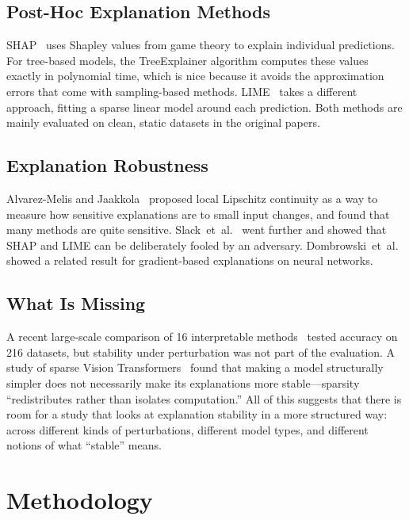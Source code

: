 \documentclass[10pt,twocolumn]{article}
\begin{document}
\subsection{Post-Hoc Explanation Methods}

SHAP~\cite{lundberg2017unified} uses Shapley values from game theory
to explain individual predictions. For tree-based models, the
TreeExplainer algorithm computes these values exactly in polynomial
time, which is nice because it avoids the approximation errors that
come with sampling-based methods.
LIME~\cite{ribeiro2016why} takes a different approach, fitting a
sparse linear model around each prediction. Both methods are mainly
evaluated on clean, static datasets in the original papers.

\subsection{Explanation Robustness}

Alvarez-Melis and Jaakkola~\cite{alvarez2018robustness} proposed
local Lipschitz continuity as a way to measure how sensitive
explanations are to small input changes, and found that many methods
are quite sensitive. Slack~et~al.~\cite{slack2020fooling} went further
and showed that SHAP and LIME can be deliberately fooled by an
adversary. Dombrowski~et~al.~\cite{dombrowski2019explanations} showed
a related result for gradient-based explanations on neural networks.

\subsection{What Is Missing}

A recent large-scale comparison of 16 interpretable
methods~\cite{comparative2026} tested accuracy on 216 datasets,
but stability under perturbation was not part of the evaluation. A
study of sparse Vision Transformers~\cite{sparse2026vit} found that
making a model structurally simpler does not necessarily make its
explanations more stable---sparsity ``redistributes rather than
isolates computation.'' All of this suggests that
there is room for a study that looks at explanation stability in a
more structured way: across different kinds of perturbations,
different model types, and different notions of what ``stable''
means.

\section{Methodology}\label{sec:method}
\end{document}
